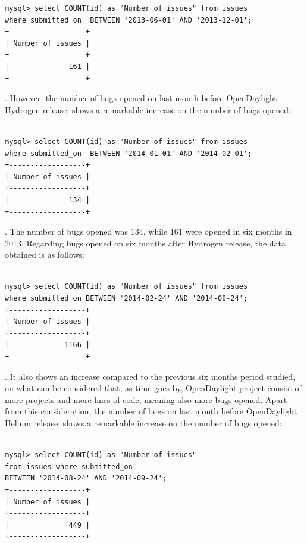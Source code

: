 \documentclass[a4paper, 12pt]{book}
\begin{document}
{\begin{verbatim}
mysql> select COUNT(id) as "Number of issues" from issues
where submitted_on  BETWEEN '2013-06-01' AND '2013-12-01';
+------------------+
| Number of issues |
+------------------+
|              161 |
+------------------+

\end{verbatim}

. However, the number of bugs opened on last month before OpenDaylight Hydrogen release, shows a remarkable increase on the number of bugs opened:

\begin{verbatim}

mysql> select COUNT(id) as "Number of issues" from issues
where submitted_on  BETWEEN '2014-01-01' AND '2014-02-01';
+------------------+
| Number of issues |
+------------------+
|              134 |
+------------------+

\end{verbatim}
. The number of bugs opened was 134, while 161 were opened in six months in 2013. Regarding bugs opened on six months after Hydrogen release, the data obtained is as follows:

\begin{verbatim}

mysql> select COUNT(id) as "Number of issues" from issues
where submitted_on BETWEEN '2014-02-24' AND '2014-08-24';
+------------------+
| Number of issues |
+------------------+
|             1166 |
+------------------+

\end{verbatim}

. It also shows an increase compared to the previous six months period studied, on what can be considered that, as time goes by, OpenDaylight project consist of more projects and more lines of code, meaning also more bugs opened. Apart from this consideration, the number of bugs on last month before OpenDaylight Helium release, shows a remarkable increase on the number of bugs opened:

\begin{verbatim}

mysql> select COUNT(id) as "Number of issues"
from issues where submitted_on
BETWEEN '2014-08-24' AND '2014-09-24';
+------------------+
| Number of issues |
+------------------+
|              449 |
+------------------+


\end{verbatim}}
\end{document}
